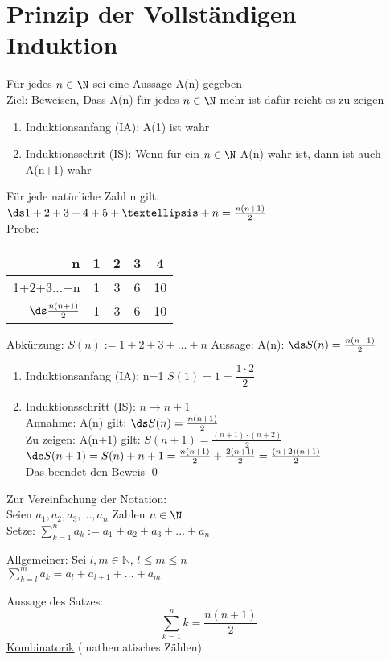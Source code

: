 \section{Prinzip der Vollständigen Induktion}
Für jedes $n \in \N$ sei eine Aussage A(n) gegeben\\
Ziel: Beweisen, Dass A(n) für jedes $n \in \N$ mehr ist dafür reicht es zu zeigen
\begin{enumerate}
\item Induktionsanfang (IA): A(1) ist wahr
\item Induktionsschrit (IS): Wenn für ein $n \in \N$ A(n) wahr ist, dann ist auch A(n+1) wahr
\end{enumerate}
%
\Satz
Für jede natürliche Zahl n gilt: $\ds 1+2+3+4+5+…+n=\frac{n(n+1)}{2}$\\
Probe:\\
\begin{tabular}{r|c|c|c|c}
n & 1 & 2 & 3 & 4\\ \hline\hline
1+2+3...+n & 1 & 3 & 6 & 10\\ \hline
$\ds \frac{n(n+1)}{2}$ & 1 & 3 & 6 & 10\\
\end{tabular}
Abkürzung: $S(n) := 1+2+3+…+n$
Aussage: A(n): $\ds S(n) = \frac{n(n+1)}{2}$
\begin{enumerate}
\item {Induktionsanfang (IA): n=1 $S(1) = 1 = \dfrac{1·2}{2}$}
\item {Induktionsschritt (IS): $n → n+1$\\
Annahme: A(n) gilt: $\ds S(n) = \frac{n(n+1)}{2}$\\
Zu zeigen: A(n+1) gilt: $S(n+1)=\frac{(n+1)\cdot(n+2)}{2}$\\
$\ds S(n+1)=S(n)+n+1=\frac{n(n+1)}{2}+\frac{2(n+1)}{2}=\frac{(n+2)(n+1)}{2}$\\
Das beendet den Beweis} \qed
\end{enumerate}
Zur Vereinfachung der Notation:\\
Seien $a_1,a_2,a_3,...,a_n$ Zahlen $n \in \N$\\
Setze: $\sum_{k=1}^n a_k := a_1+a_2+a_3+…+a_n$\\
\begin{tabbing}
Allgemeiner: \=Sei $l,m \in \mathds{N}$, $l \le m \le n$\\
\>$\sum_{k=l}^m a_k = a_l+a_{l+1}+…+a_m$\\
\end{tabbing}
Aussage des Satzes:
\[ \sum_{k=1}^n k = \frac{n(n+1)}{2}\]
\hfill\underline{Kombinatorik} (mathematisches Zählen)

